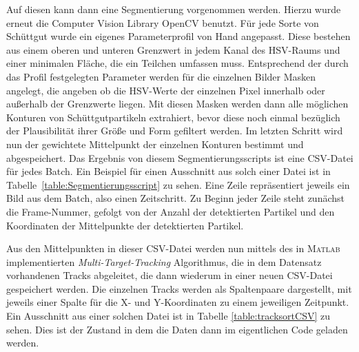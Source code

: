 Auf diesen kann dann eine Segmentierung vorgenommen werden.
Hierzu wurde erneut die Computer Vision Library OpenCV benutzt.
Für jede Sorte von Schüttgut wurde ein eigenes Parameterprofil von Hand angepasst.
Diese bestehen aus einem oberen und unteren Grenzwert in jedem Kanal des HSV-Raums und einer minimalen Fläche, die ein Teilchen umfassen muss.
Entsprechend der durch das Profil festgelegten Parameter werden für die einzelnen Bilder Masken angelegt,
die angeben ob die HSV-Werte der einzelnen Pixel innerhalb oder außerhalb der Grenzwerte liegen. 
Mit diesen Masken werden dann alle möglichen Konturen von Schüttgutpartikeln extrahiert, 
bevor diese noch einmal bezüglich der Plausibilität ihrer Größe und Form gefiltert werden. 
Im letzten Schritt wird nun der gewichtete Mittelpunkt der einzelnen Konturen bestimmt und abgespeichert.
Das Ergebnis von diesem Segmentierungsscripts ist eine CSV-Datei für jedes Batch.
Ein Beispiel für einen Ausschnitt aus solch einer Datei ist in Tabelle~\ref{table:Segmentierungsscript} zu sehen.
Eine Zeile repräsentiert jeweils ein Bild aus dem Batch, also einen Zeitschritt.
Zu Beginn jeder Zeile steht zunächst die Frame-Nummer, gefolgt von der Anzahl der detektierten Partikel
und den Koordinaten der Mittelpunkte der detektierten Partikel.


    

Aus den Mittelpunkten in dieser CSV-Datei werden nun mittels des in \textsc{Matlab} implementierten \textit{Multi-Target-Tracking} Algorithmus, die in dem Datensatz vorhandenen Tracks abgeleitet,
die dann wiederum in einer neuen CSV-Datei gespeichert werden.
Die einzelnen Tracks werden als Spaltenpaare dargestellt, mit jeweils einer Spalte für die X- und Y-Koordinaten zu einem jeweiligen Zeitpunkt.
Ein Ausschnitt aus einer solchen Datei ist in Tabelle \ref{table:tracksortCSV} zu sehen.
Dies ist der Zustand in dem die Daten dann im eigentlichen Code geladen werden. 

